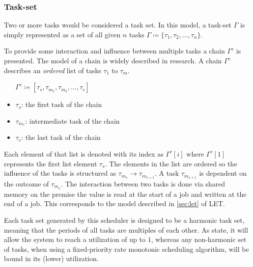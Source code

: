 \subsubsection{Task-set}\label{sec:taskset}
Two or more tasks would be considered a task set.
In this model, a task-set $\Gamma$ is simply represented as a set of all given $n$ tasks $\Gamma \coloneqq \{\tau_1, \tau_2, \ldots, \tau_n\}$.

To provide some interaction and influence between multiple tasks a chain $\Gamma^c$ is presented.
The model of a chain is widely described in research\cite{
beckerSynthesizingJoblevelDependencies2016,abdullahWorstcaseCauseeffectReaction2019,choiChainBasedFixedPriorityScheduling2020}.
A chain $\Gamma^c$ describes an \textit{ordered} list of tasks $\tau_1$ to $\tau_m$.
\begin{center}
    $\Gamma^c \coloneqq [\tau_s,\tau_{m_1},\tau_{m_2}, \ldots, \tau_e]$
\end{center}
\begin{itemize}
    \item $\tau_s$: the first task of the chain
    \item $\tau_{m_*}$: intermediate task of the chain
    \item $\tau_e$: the last task of the chain
\end{itemize}
Each element of that list is denoted with its index as $\Gamma^c[i]$ where $\Gamma^c[1]$ represents the first list element $\tau_s$\cite{choiChainBasedFixedPriorityScheduling2020}.
The elements in the list are ordered so the influence of the tasks is structured as $\tau_{m_x} \rightarrow \tau_{m_{x+1}}$.
A task $\tau_{m_{x+1}}$ is dependent on the outcome of $ \tau_{m_{x}}$.
The interaction between two tasks is done via shared memory on the premise the value is read at the start of a job and written at the end of a job\cite{choiChainBasedFixedPriorityScheduling2020}.
This corresponds to the model described in \cref{sec:let} of \ac{LET}.

Each task set generated by this scheduler is designed to be a harmonic task set, meaning that the periods of all tasks are multiples of each other\cite{liuSchedulingAlgorithmsMultiprogramming1973,kuoLoadAdjustmentAdaptive1991}.
As \textcite{liuSchedulingAlgorithmsMultiprogramming1973} state, it will allow the system to reach a utilization of up to $1$, whereas any non-harmonic set of tasks, when using a fixed-priority rate monotonic scheduling algorithm, will be bound in its (lower) utilization.

